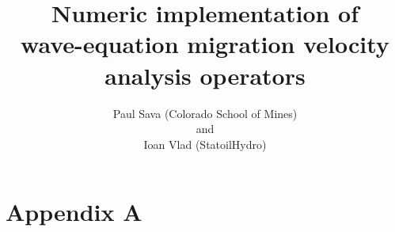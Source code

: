 \title{Numeric implementation of \\ wave-equation migration velocity analysis operators}
\author{Paul Sava (Colorado School of Mines)
\\ and \\
Ioan Vlad (StatoilHydro)}

\maketitle












\newpage
\appendix
\section{Appendix A}





